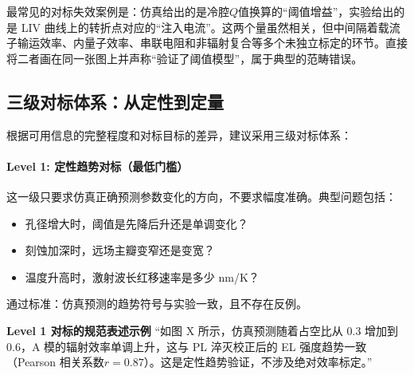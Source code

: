 \begin{WhatCouldGoWrong}
最常见的对标失效案例是：仿真给出的是冷腔$Q$值换算的“阈值增益”，实验给出的是 LIV 曲线上的转折点对应的“注入电流”。这两个量虽然相关，但中间隔着载流子输运效率、内量子效率、串联电阻和非辐射复合等多个未独立标定的环节。直接将二者画在同一张图上并声称“验证了阈值模型”，属于典型的范畴错误。
\end{WhatCouldGoWrong}

\subsection{三级对标体系：从定性到定量}
根据可用信息的完整程度和对标目标的差异，建议采用三级对标体系：

\paragraph{Level 1: 定性趋势对标（最低门槛）}
这一级只要求仿真正确预测参数变化的方向，不要求幅度准确。典型问题包括：
\begin{itemize}
  \item 孔径增大时，阈值是先降后升还是单调变化？
  \item 刻蚀加深时，远场主瓣变窄还是变宽？
  \item 温度升高时，激射波长红移速率是多少 nm/K？
\end{itemize}
通过标准：仿真预测的趋势符号与实验一致，且不存在反例。

\begin{ReportingStandardBox}
\textbf{Level 1 对标的规范表述示例}
“如图 X 所示，仿真预测随着占空比从 0.3 增加到 0.6，A 模的辐射效率单调上升，这与 PL 淬灭校正后的 EL 强度趋势一致（Pearson 相关系数$r=0.87$）。这是定性趋势验证，不涉及绝对效率标定。”
\end{ReportingStandardBox}

